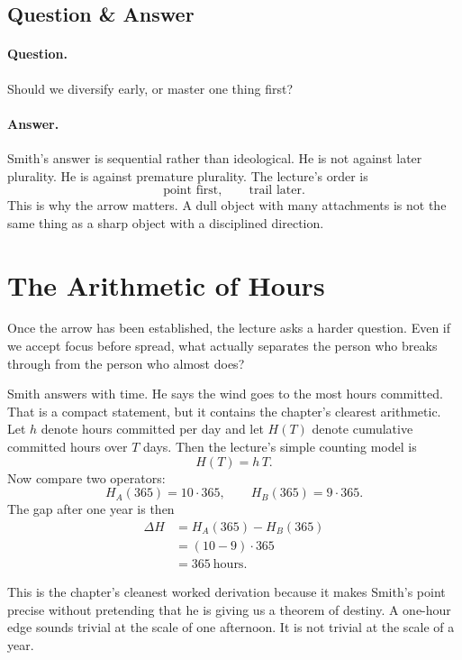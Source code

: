 \subsection{Question \& Answer}

\paragraph{Question.} Should we diversify early, or master one thing first?

\paragraph{Answer.} Smith's answer is sequential rather than ideological. He is not against later plurality. He is against premature plurality. The lecture's order is
\[
\text{point first}, \qquad \text{trail later}.
\]
This is why the arrow matters. A dull object with many attachments is not the same thing as a sharp object with a disciplined direction.

\section{The Arithmetic of Hours}

Once the arrow has been established, the lecture asks a harder question. Even if we accept focus before spread, what actually separates the person who breaks through from the person who almost does?

Smith answers with time. He says the wind goes to the most hours committed. That is a compact statement, but it contains the chapter's clearest arithmetic. Let \(h\) denote hours committed per day and let \(H(T)\) denote cumulative committed hours over \(T\) days. Then the lecture's simple counting model is
\begin{equation}
H(T)=h\,T.
\end{equation}
Now compare two operators:
\begin{equation}
H_A(365)=10\cdot 365,
\qquad
H_B(365)=9\cdot 365.
\end{equation}
The gap after one year is then
\begin{align}
\Delta H
&=H_A(365)-H_B(365) \\
&=(10-9)\cdot 365 \\
&=365\ \text{hours}.
\end{align}

This is the chapter's cleanest worked derivation because it makes Smith's point precise without pretending that he is giving us a theorem of destiny. A one-hour edge sounds trivial at the scale of one afternoon. It is not trivial at the scale of a year.

